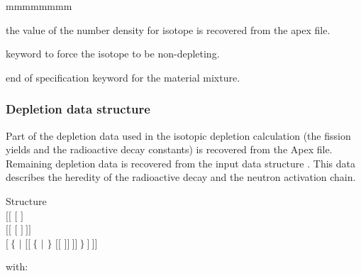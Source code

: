 \begin{ListeDeDescription}{mmmmmmmm}
\item[\moc{*}] the value of the number density for isotope  is recovered from the {\sc apex} file.

\item[\moc{NOEV}] keyword to force the isotope  to be non-depleting.

\item[\moc{ENDMIX}] end of specification keyword for the material mixture.

\end{ListeDeDescription}

\subsubsection{Depletion data structure}\label{sect:ACRdescdepld}

Part of the depletion data used in the isotopic depletion calculation (the fission yields and the
radioactive decay constants) is recovered from the Apex file. Remaining depletion data is
recovered from the input data structure . This data describes the heredity of the radioactive decay
and the neutron activation chain.

\begin{DataStructure}{Structure }
 \\
\hskip 0.3cm $[[$  $[$  $]$ \\
\hskip 0.6cm $[[$  $[$  $]~]]$ \\
\hskip 0.6cm $[~\{$  $|$  $[[~\{$  $|$  $\}$
$[[$   $]]~]]~\}~]~]]$\\
\end{DataStructure}

\noindent
with:

